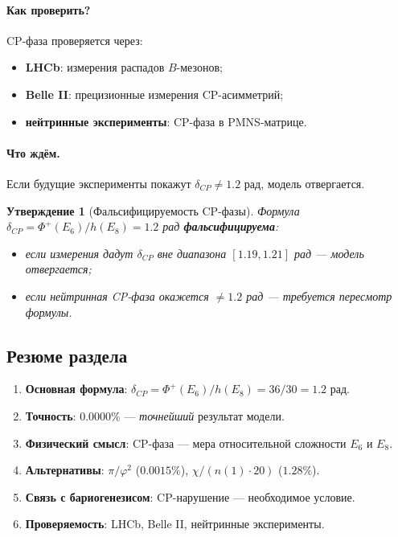 \documentclass[11pt,a4paper]{article}
\newtheorem{proposition}[theorem]{Утверждение}
\theoremstyle{definition}
\begin{document}
\paragraph{Как проверить?}
CP-фаза проверяется через:
\begin{itemize}
    \item \textbf{LHCb}: измерения распадов $B$-мезонов;
    \item \textbf{Belle II}: прецизионные измерения CP-асимметрий;
    \item \textbf{нейтринные эксперименты}: CP-фаза в PMNS-матрице.
\end{itemize}

\paragraph{Что ждём.}
Если будущие эксперименты покажут $\delta_{CP} \neq 1.2$ рад, 
модель отвергается.

\begin{proposition}[Фальсифицируемость CP-фазы]
\label{prop:cp-falsifiable}
Формула $\delta_{CP} = \Phi^+(E_6)/h(E_8) = 1.2$ рад 
\textbf{фальсифицируема}:
\begin{itemize}
    \item если измерения дадут $\delta_{CP}$ вне диапазона 
          $[1.19, 1.21]$ рад — модель отвергается;
    \item если нейтринная CP-фаза окажется $\neq 1.2$ рад — 
          требуется \emph{пересмотр} формулы.
\end{itemize}
\end{proposition}

\subsection{Резюме раздела}
\label{subsec:cp-summary}

\begin{enumerate}
    \item \textbf{Основная формула}: 
          $\delta_{CP} = \Phi^+(E_6)/h(E_8) = 36/30 = 1.2$ рад.
    \item \textbf{Точность}: $0.0000\%$ — \emph{точнейший} 
          результат модели.
    \item \textbf{Физический смысл}: CP-фаза — мера относительной 
          сложности $E_6$ и $E_8$.
    \item \textbf{Альтернативы}: $\pi/\varphi^2$ 
          ($0.0015\%$), $\chi/(n(1) \cdot 20)$ ($1.28\%$).
    \item \textbf{Связь с бариогенезисом}: CP-нарушение — 
          необходимое условие.
    \item \textbf{Проверяемость}: LHCb, Belle II, нейтринные 
          эксперименты.
\end{enumerate}
\end{document}
